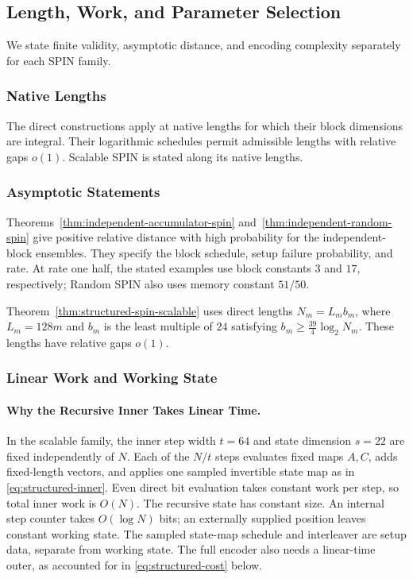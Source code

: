 \subsection{Length, Work, and Parameter Selection}
\label{sec:scaling}

We state finite validity, asymptotic distance, and encoding complexity
separately for each SPIN family.

\subsubsection{Native Lengths}

The direct constructions apply at native lengths for which their block
dimensions are integral. Their logarithmic schedules permit admissible lengths
with relative gaps \(o(1)\). Scalable SPIN is stated along its native lengths.

\subsubsection{Asymptotic Statements}

Theorems~\ref{thm:independent-accumulator-spin}
and~\ref{thm:independent-random-spin} give positive relative distance with
high probability for the independent-block ensembles. They specify the block
schedule, setup failure probability, and rate. At rate one half, the stated
examples use block constants \(3\) and \(17\), respectively; Random SPIN also
uses memory constant \(51/50\).

Theorem~\ref{thm:structured-spin-scalable} uses direct lengths
$N_m=L_mb_m$, where $L_m=128m$ and $b_m$ is the least multiple of $24$
satisfying $b_m\ge\frac{39}{4}\log_2N_m$. These lengths have relative gaps $o(1)$.

\subsubsection{Linear Work and Working State}

\paragraph{Why the Recursive Inner Takes Linear Time.}
In the scalable family, the inner step width $t=64$ and state dimension
$s=22$ are fixed independently of $N$. Each of the $N/t$ steps evaluates
fixed maps $A,C$, adds fixed-length vectors, and applies one sampled
invertible state map as in \eqref{eq:structured-inner}. Even direct bit
evaluation takes constant work per step, so total inner work is $O(N)$.
The recursive state has constant size. An internal step counter takes
$O(\log N)$ bits; an externally supplied position leaves constant
working state. The sampled state-map schedule and interleaver are setup
data, separate from working state.
The full encoder also needs a linear-time outer, as accounted for in
\eqref{eq:structured-cost} below.

